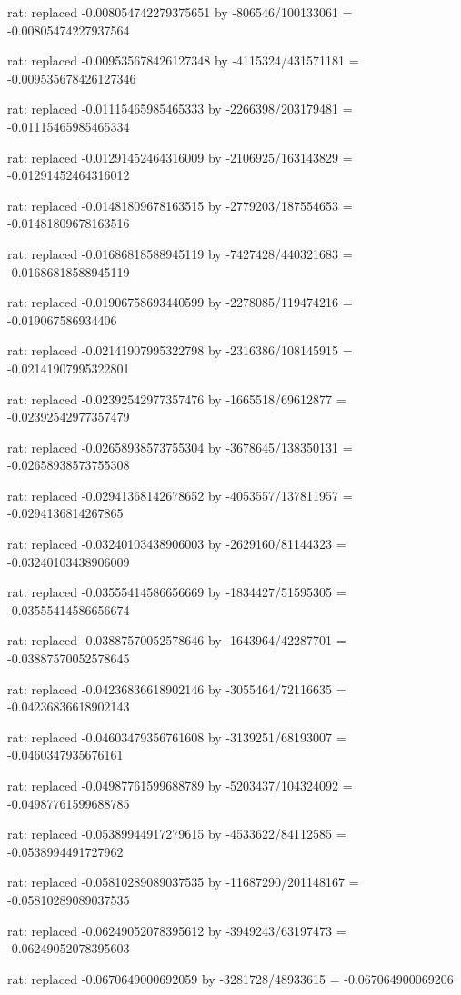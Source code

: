\documentclass[a4paper,10pt]{article}
\begin{document}
\begin{eulernotebook}
\begin{eulercomment}
\begin{eulercomment}
\begin{eulercomment}
\begin{eulercomment}
\begin{eulercomment}
\begin{eulercomment}
\begin{eulercomment}
\begin{eulercomment}
\begin{eulercomment}
\begin{eulercomment}
\begin{eulercomment}
\begin{eulercomment}
\begin{eulercomment}
\begin{eulercomment}
\begin{eulercomment}
\begin{eulercomment}
\begin{euleroutput}
  rat: replaced -0.008054742279375651 by -806546/100133061 = -0.00805474227937564
  
  rat: replaced -0.009535678426127348 by -4115324/431571181 = -0.009535678426127346
  
  rat: replaced -0.01115465985465333 by -2266398/203179481 = -0.01115465985465334
  
  rat: replaced -0.01291452464316009 by -2106925/163143829 = -0.01291452464316012
  
  rat: replaced -0.01481809678163515 by -2779203/187554653 = -0.01481809678163516
  
  rat: replaced -0.01686818588945119 by -7427428/440321683 = -0.01686818588945119
  
  rat: replaced -0.01906758693440599 by -2278085/119474216 = -0.019067586934406
  
  rat: replaced -0.02141907995322798 by -2316386/108145915 = -0.02141907995322801
  
  rat: replaced -0.02392542977357476 by -1665518/69612877 = -0.02392542977357479
  
  rat: replaced -0.02658938573755304 by -3678645/138350131 = -0.02658938573755308
  
  rat: replaced -0.02941368142678652 by -4053557/137811957 = -0.0294136814267865
  
  rat: replaced -0.03240103438906003 by -2629160/81144323 = -0.03240103438906009
  
  rat: replaced -0.03555414586656669 by -1834427/51595305 = -0.03555414586656674
  
  rat: replaced -0.03887570052578646 by -1643964/42287701 = -0.03887570052578645
  
  rat: replaced -0.04236836618902146 by -3055464/72116635 = -0.04236836618902143
  
  rat: replaced -0.04603479356761608 by -3139251/68193007 = -0.0460347935676161
  
  rat: replaced -0.04987761599688789 by -5203437/104324092 = -0.04987761599688785
  
  rat: replaced -0.05389944917279615 by -4533622/84112585 = -0.0538994491727962
  
  rat: replaced -0.05810289089037535 by -11687290/201148167 = -0.05810289089037535
  
  rat: replaced -0.06249052078395612 by -3949243/63197473 = -0.06249052078395603
  
  rat: replaced -0.0670649000692059 by -3281728/48933615 = -0.067064900069206
  

\end{euleroutput}
\end{eulercomment}
\end{eulercomment}
\end{eulercomment}
\end{eulercomment}
\end{eulercomment}
\end{eulercomment}
\end{eulercomment}
\end{eulercomment}
\end{eulercomment}
\end{eulercomment}
\end{eulercomment}
\end{eulercomment}
\end{eulercomment}
\end{eulercomment}
\end{eulercomment}
\end{eulercomment}
\end{eulernotebook}
\end{document}
